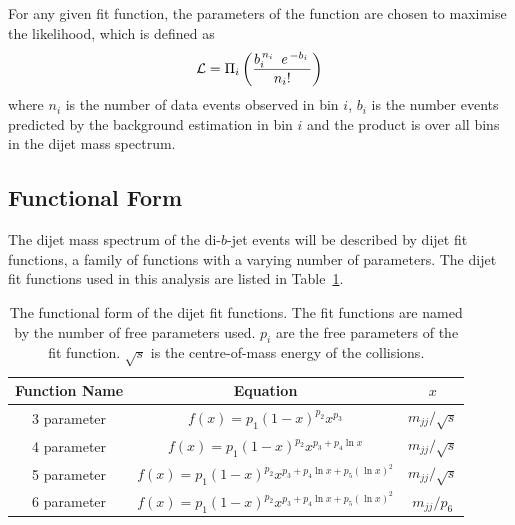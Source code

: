 For any given fit function, the parameters of the function are chosen to maximise the likelihood,
which is defined as
\begin{equation}
  \large {\ensuremath{\mathcal{L}}=  \Pi_i \left(  \frac{b_i^{\,n_i\,}~e^{\,-b_i\,}}{n_i!} \right)}
  \label{eqn:bkg-like}
\end{equation}
where $n_i$ is the number of data events observed in bin $i$,
$b_i$ is the number events predicted by the background estimation in bin $i$
and the product is over all bins in the dijet mass spectrum.

\subsection{Functional Form}
\label{sec:bkg-func}



The dijet mass spectrum of the di-$b$-jet events will be described by dijet fit functions,
a family of functions with a varying number of parameters.
The dijet fit functions used in this analysis are listed in Table~\ref{tab:bkg-fit}.

{\renewcommand{\arraystretch}{1.2}
\begin{table}[!thb]
\centering
\begin{tabular}{|c||c|c|}
  \hline
  Function Name & Equation                                          & $x$ \\
  \hline
  3 parameter   & $f(x)=p_1(1-x)^{p_2}x^{p_3}$                        & $m_{jj}/\sqrt{s}$ \\
  4 parameter   & $f(x)=p_1(1-x)^{p_2}x^{p_3+p_4\ln{x}}$               & $m_{jj}/\sqrt{s}$\\
  5 parameter   & $f(x)=p_1(1-x)^{p_2}x^{p_3+p_4\ln{x}+p_5(\ln{x})^{2}}$  & $m_{jj}/\sqrt{s}$\\ 
  6 parameter   & $f(x)=p_1(1-x)^{p_2}x^{p_3+p_4\ln{x}+p_5(\ln{x})^{2}}$  &  $m_{jj}/p_6$\\ 
  \hline
\end{tabular}
\caption{The functional form of the dijet fit functions.
  The fit functions are named by the number of free parameters used. $p_{i}$ are the free parameters of the fit function.
  $\sqrt{s}$ is the centre-of-mass energy of the collisions.}
\label{tab:bkg-fit}
\end{table}}


